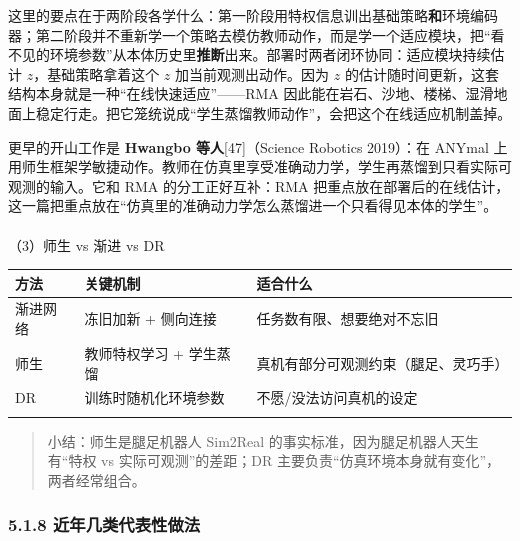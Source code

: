 \documentclass[
  chinese,
]{ctexart}
\makeatletter
\let\oldparagraph\paragraph
\renewcommand{\paragraph}{
    \@ifstar
      \xxxParagraphStar
      \xxxParagraphNoStar
  }
\newcommand{\xxxParagraphStar}[1]{\oldparagraph*{#1}\mbox{}}
\newcommand{\xxxParagraphNoStar}[1]{\oldparagraph{#1}\mbox{}}
\makeatother
\begin{document}
这里的要点在于两阶段各学什么：第一阶段用特权信息训出基础策略\textbf{和}环境编码器；第二阶段并不重新学一个策略去模仿教师动作，而是学一个适应模块，把``看不见的环境参数''从本体历史里\textbf{推断}出来。部署时两者闭环协同：适应模块持续估计
\(z\)，基础策略拿着这个 \(z\) 加当前观测出动作。因为 \(z\)
的估计随时间更新，这套结构本身就是一种``在线快速适应''------RMA
因此能在岩石、沙地、楼梯、湿滑地面上稳定行走。把它笼统说成``学生蒸馏教师动作''，会把这个在线适应机制盖掉。

更早的开山工作是 \textbf{Hwangbo 等人}{[}47{]}（Science Robotics
2019）：在 ANYmal
上用师生框架学敏捷动作。教师在仿真里享受准确动力学，学生再蒸馏到只看实际可观测的输入。它和
RMA 的分工正好互补：RMA
把重点放在部署后的在线估计，这一篇把重点放在``仿真里的准确动力学怎么蒸馏进一个只看得见本体的学生''。

\paragraph{（3）师生 vs 渐进 vs
DR}\label{ux5e08ux751f-vs-ux6e10ux8fdb-vs-dr}

\begin{center}
\begin{tabular}{@{}>{\raggedright\arraybackslash}p{} >{\raggedright\arraybackslash}p{} >{\raggedright\arraybackslash}p{}@{}}
\toprule\noalign{}
方法 & 关键机制 & 适合什么 \\
\midrule\noalign{}
渐进网络 & 冻旧加新 + 侧向连接 & 任务数有限、想要绝对不忘旧 \\
师生 & 教师特权学习 + 学生蒸馏 & 真机有部分可观测约束（腿足、灵巧手） \\
DR & 训练时随机化环境参数 & 不愿/没法访问真机的设定 \\
\bottomrule\noalign{}
\end{tabular}
\end{center}

\begin{quote}
小结：师生是腿足机器人 Sim2Real 的事实标准，因为腿足机器人天生有``特权
vs 实际可观测''的差距；DR
主要负责``仿真环境本身就有变化''，两者经常组合。
\end{quote}

\subsubsection{5.1.8
近年几类代表性做法}\label{ux8fd1ux5e74ux51e0ux7c7bux4ee3ux8868ux6027ux505aux6cd5}
\end{document}
